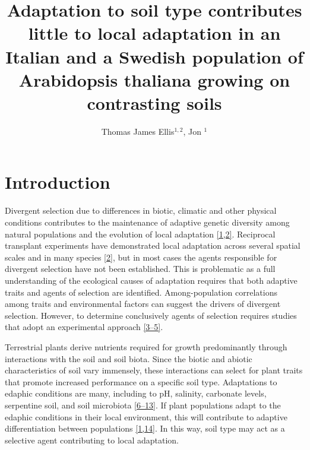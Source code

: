 \documentclass[twocolumn,twoside,lettersize]{article}
\title{Adaptation to soil type contributes little to local adaptation in an Italian and a Swedish population of Arabidopsis thaliana growing on contrasting soils}
\author{
Thomas James Ellis$^{1,2}$,
Jon \AAgren$^{1}$\Email
}
\date{
 \begin{list}{}{%
      \setlength{\leftmargin}{0cm}%
      \setlength{\rightmargin}{\leftmargin}}%
  \item\normalsize\bf 
  Natural populations are subject to selection caused by a range of biotic and abiotic factors in their native habitats. Identifying these agents of selection and quantifying their effects is key to understanding how populations adapt to local conditions.
  We performed a fully factorial reciprocal transplant experiment using locally adapted accessions of \textit{Arabidopsis thaliana} at their native sites to distinguish the contributions of adaptation to soil type and climate. Overall adaptive differentiation was strong at both sites.
  However, we found only very small differences in the strength of selection on local and non-local soil, and adaptation to soil type at most constituted only a few percent of overall adaptive differentiation.
  These results indicate that adaptation to local climatic conditions rather than soil type is the primary driver of adaptive differentiation between these ecotypes..
  \end{list}
}
\begin{document}
\maketitle

\section*{Introduction}

Divergent selection due to differences in biotic, climatic and other physical conditions contributes to the maintenance of adaptive genetic diversity among natural populations and the evolution of local adaptation \href{https://paperpile.com/c/ktzZ5s/ew6X+BXzn}{[1,2]}. Reciprocal transplant experiments have demonstrated local adaptation across several spatial scales and in many species \href{https://paperpile.com/c/ktzZ5s/BXzn}{[2]}, but in most cases the agents responsible for divergent selection have not been established. This is problematic as a full understanding of the ecological causes of adaptation requires that both adaptive traits and agents of selection are identified. Among-population correlations among traits and environmental factors can suggest the drivers of divergent selection. However, to determine conclusively agents of selection requires studies that adopt an experimental approach \href{https://paperpile.com/c/ktzZ5s/tkUY+Jtrp+udHh}{[3–5]}.

Terrestrial plants derive nutrients required for growth predominantly through interactions with the soil and soil biota. Since the biotic and abiotic characteristics of soil vary immensely, these interactions can select for plant traits that promote increased performance on a specific soil type. Adaptations to edaphic conditions are many, including to pH, salinity, carbonate levels, serpentine soil, and soil microbiota \href{https://paperpile.com/c/ktzZ5s/qqZK+G0mo+XsYh+iGzU+bufo+3GT2+D5pX+1D9V}{[6–13]}. If plant populations adapt to the edaphic conditions in their local environment, this will contribute to adaptive differentiation between populations \href{https://paperpile.com/c/ktzZ5s/C4P1+ew6X}{[1,14]}. In this way, soil type may act as a selective agent contributing to local adaptation.
\end{document}
